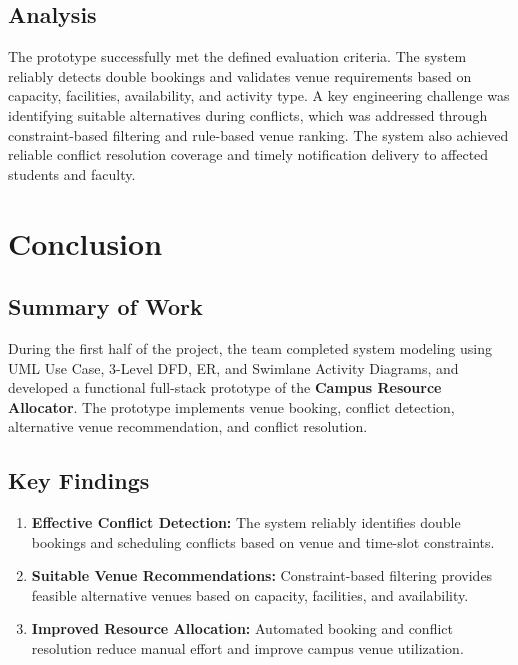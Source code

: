 \documentclass[12pt, a4paper, oneside]{report}
\begin{document}
\section{Analysis}

The prototype successfully met the defined evaluation criteria. The system reliably detects double bookings and validates venue requirements based on capacity, facilities, availability, and activity type. A key engineering challenge was identifying suitable alternatives during conflicts, which was addressed through constraint-based filtering and rule-based venue ranking. The system also achieved reliable conflict resolution coverage and timely notification delivery to affected students and faculty.
\chapter{Conclusion}
\section{Summary of Work}

During the first half of the project, the team completed system modeling using UML Use Case, 3-Level DFD, ER, and Swimlane Activity Diagrams, and developed a functional full-stack prototype of the \textbf{Campus Resource Allocator}. The prototype implements venue booking, conflict detection, alternative venue recommendation, and conflict resolution.

\section{Key Findings}

\begin{enumerate}
    \item \textbf{Effective Conflict Detection:} The system reliably identifies double bookings and scheduling conflicts based on venue and time-slot constraints.
    \item \textbf{Suitable Venue Recommendations:} Constraint-based filtering provides feasible alternative venues based on capacity, facilities, and availability.
    \item \textbf{Improved Resource Allocation:} Automated booking and conflict resolution reduce manual effort and improve campus venue utilization.
\end{enumerate}
\end{document}
